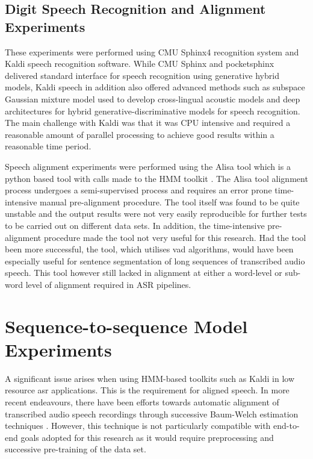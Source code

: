 \subsection{Digit Speech Recognition and Alignment Experiments}\label{sec_digitspeech}
These experiments were performed using CMU Sphinx4 recognition system and Kaldi speech recognition software.  While CMU Sphinx and pocketsphinx delivered standard interface for speech recognition using generative hybrid models, Kaldi speech in addition also offered advanced methods such as subspace Gaussian mixture model used to develop cross-lingual acoustic models and deep architectures for hybrid generative-discriminative models for speech recognition.   The main challenge with Kaldi was that it was CPU intensive and required a reasonable amount of parallel processing to achieve good results within a reasonable time period. 

Speech alignment experiments were performed using the Alisa \cite{stan2016alisa} tool which is a python based tool with calls made to the HMM toolkit \cite{young2002htk}.  The Alisa tool alignment process undergoes a semi-supervised process and requires an error prone time-intensive manual pre-alignment procedure.  The tool itself was found to be quite unstable and the output results were not very easily reproducible for further tests to be carried out on different data sets.  In addition, the time-intensive pre-alignment procedure made the tool not very useful for this research. Had the tool been more successful, the tool, which utilises \acrfull{vad} algorithms, would have been especially useful for sentence segmentation of long sequences of transcribed audio speech.  This tool however still lacked in alignment at either a word-level or sub-word level of alignment required in ASR pipelines.

\startblue
\section{Sequence-to-sequence Model Experiments}\label{sec_postalign}
A significant issue arises when using HMM-based toolkits such as Kaldi in low resource \acrshort{asr} applications.  This is the requirement for aligned speech.  In more recent endeavours, there have been efforts towards automatic alignment of transcribed audio speech recordings through successive Baum-Welch estimation techniques \citep{gales2014speech,ragni2018automatic,ragni2014data}. However, this technique is not particularly compatible with end-to-end goals adopted for this research as it would require preprocessing and successive pre-training of the data set.


